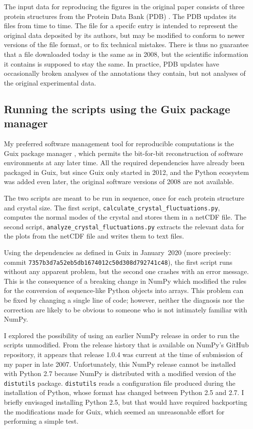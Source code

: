 The input data for reproducing the figures in the original paper consists of three protein structures from the Protein Data Bank (PDB) \cite{wwPDBconsortiumProteinDataBank2019}. The PDB updates its files from time to time. The file for a specifc entry is intended to represent the original data deposited by its authors, but may be modified to conform to newer versions of the file format, or to fix technical mistakes. There is thus no guarantee that a file downloaded today is the same as in 2008, but the scientific information it contains is supposed to stay the same. In practice, PDB updates have occasionally broken analyses of the annotations they contain, but not analyses of the original experimental data.

\subsection*{Running the scripts using the Guix package manager}

My preferred software management tool for reproducible computations is the Guix package manager \cite{CourtesReproducibleUserControlledSoftware2015}, which permits the bit-for-bit reconstruction of software environments at any later time. All the required dependencies have already been packaged in Guix, but since Guix only started in 2012, and the Python ecosystem was added even later, the original software versions of 2008 are not available.

The two scripts are meant to be run in sequence, once for each protein structure and crystal size. The first script, \texttt{calculate\_crystal\_fluctuations.py}, computes the normal modes of the crystal and stores them in a netCDF file. The second script, \texttt{analyze\_crystal\_fluctuations.py} extracts the relevant data for the plots from the netCDF file and writes them to text files.

Using the dependencies as defined in Guix in January~2020 (more precisely: commit \texttt{7357b3d7a52eb5db1674012c50d308d792741c48}), the first script runs without any apparent problem, but the second one crashes with an error message. This is the consequence of a breaking change in NumPy which modified the rules for the conversion of sequence-like Python objects into arrays. This problem can be fixed by changing a single line of code; however, neither the diagnosis nor the correction are likely to be obvious to someone who is not intimately familiar with NumPy.

I explored the possibility of using an earlier NumPy release in order to run the scripts unmodified. From the release history that is available on NumPy's GitHub repository, it appears that release 1.0.4 was current at the time of submission of my paper in late 2007. Unfortunately, this NumPy release cannot be installed with Python 2.7 because NumPy is distributed with a modified version of the \texttt{distutils} package. \texttt{distutils}  reads a configuration file produced during the installation of Python, whose format has changed between Python 2.5 and 2.7. I briefly envisaged installing Python 2.5, but that would have required backporting the modifications made for Guix, which seemed an unreasonable effort for performing a simple test.

